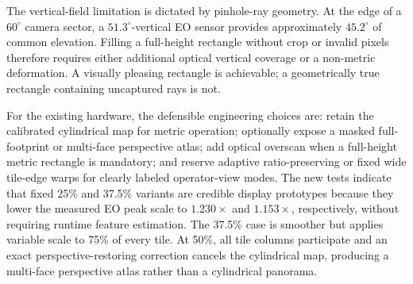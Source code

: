 \documentclass[10pt]{article}
\begin{document}
The vertical-field limitation is dictated by pinhole-ray geometry. At the edge of a $60^\circ$ camera sector, a $51.3^\circ$-vertical EO sensor provides approximately $45.2^\circ$ of common elevation. Filling a full-height rectangle without crop or invalid pixels therefore requires either additional optical vertical coverage or a non-metric deformation. A visually pleasing rectangle is achievable; a geometrically true rectangle containing uncaptured rays is not.

For the existing hardware, the defensible engineering choices are: retain the calibrated cylindrical map for metric operation; optionally expose a masked full-footprint or multi-face perspective atlas; add optical overscan when a full-height metric rectangle is mandatory; and reserve adaptive ratio-preserving or fixed wide tile-edge warps for clearly labeled operator-view modes. The new tests indicate that fixed 25\% and 37.5\% variants are credible display prototypes because they lower the measured EO peak scale to $1.230\times$ and $1.153\times$, respectively, without requiring runtime feature estimation. The 37.5\% case is smoother but applies variable scale to 75\% of every tile. At 50\%, all tile columns participate and an exact perspective-restoring correction cancels the cylindrical map, producing a multi-face perspective atlas rather than a cylindrical panorama.

\begin{center}
\end{center}
\end{document}
